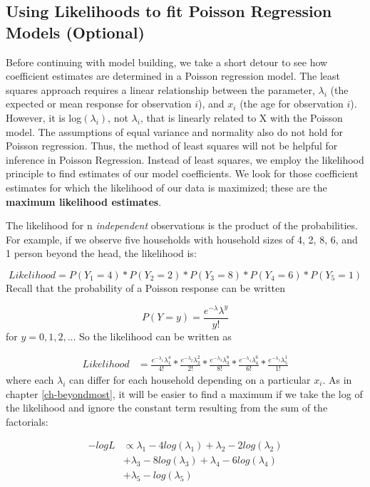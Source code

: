 \documentclass[
]{krantz}
\begin{document}
\hypertarget{likelihood.sec}{%
\subsection{Using Likelihoods to fit Poisson Regression Models (Optional)}\label{likelihood.sec}}

Before continuing with model building, we take a short detour to see how coefficient estimates are determined in a Poisson regression model. The least squares approach requires a linear relationship between the parameter, \(\lambda_i\) (the expected or mean response for observation \(i\)), and \(x_i\) (the age for observation \(i\)). However, it is log\((\lambda_i)\), not \(\lambda_i\), that is linearly related to X with the Poisson model. The assumptions of equal variance and normality also do not hold for Poisson regression. Thus, the method of least squares will not be helpful for inference in Poisson Regression. Instead of least squares, we employ the likelihood  principle to find estimates of our model coefficients. We look for those coefficient estimates for which the likelihood of our data is maximized; these are the \textbf{maximum likelihood estimates}. 

The likelihood for n \emph{independent}  observations is the product of the probabilities. For example, if we observe five households with household sizes of 4, 2, 8, 6, and 1 person beyond the head, the likelihood is:

\[ Likelihood = P(Y_1=4)*P(Y_2=2)*P(Y_3=8)*P(Y_4=6)*P(Y_5=1)\]
Recall that the probability of a Poisson response can be written

\[P(Y=y)=\frac{e^{-\lambda}\lambda^y}{y!}\]
for \(y = 0, 1, 2, ...\) So the likelihood can be written as

\begin{align*}
 Likelihood&= \frac{ e^{-\lambda_1}\lambda_1^4 }{ 4! }*
 \frac{ e^{-\lambda_2}\lambda_2^2 }{ 2! } *\frac{e^{-\lambda_3}\lambda_3^8}{8!}*
 \frac{e^{-\lambda_4}\lambda_4^6}{6!}*\frac{e^{-\lambda_5}\lambda_5^1}{1!}
 \end{align*}
where each \(\lambda_i\) can differ for each household depending on a particular \(x_i\). As in chapter \ref{ch-beyondmost}, it will be easier to find a maximum if we take the log of the likelihood and ignore the constant term resulting from the sum of the factorials:

\begin{align}
 -logL& \propto \lambda_{1}-4log(\lambda_{1})+\lambda_{2}-2log(\lambda_{2}) \nonumber \\
 & +\lambda_{3}-8log(\lambda_{3})+\lambda_{4}-6log(\lambda_{4}) \nonumber \\
 & +\lambda_{5}-log(\lambda_{5})
 \label{eq:poisLoglik}
\end{align}
\end{document}
